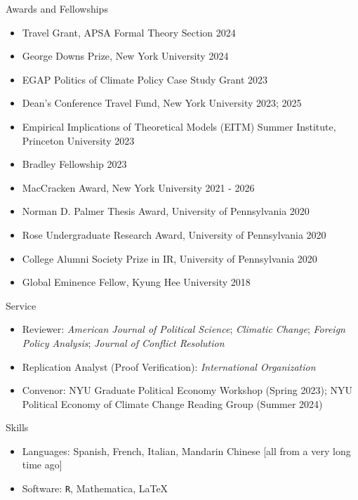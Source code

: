 \documentclass{resume} %
\begin{document}
\begin{rSection}{Awards and Fellowships}
\begin{itemize}
\item Travel Grant, APSA Formal Theory Section \hfill 2024
\item George Downs Prize, New York University \hfill 2024
\item EGAP Politics of Climate Policy Case Study Grant \hfill 2023
\item Dean's Conference Travel Fund, New York University \hfill 2023; 2025
\item Empirical Implications of Theoretical Models (EITM) Summer Institute, Princeton University \hfill 2023
\item Bradley Fellowship \hfill 2023
\item MacCracken Award, New York University \hfill 2021 - 2026
\item Norman D. Palmer Thesis Award, University of Pennsylvania \hfill 2020
\item Rose Undergraduate Research Award, University of Pennsylvania \hfill 2020
\item College Alumni Society Prize in IR, University of Pennsylvania \hfill 2020
\item Global Eminence Fellow, Kyung Hee University \hfill 2018
\end{itemize}
\end{rSection}

\begin{rSection}{Service}
\begin{itemize}
\item Reviewer:  \textit{American Journal of Political Science};  \textit{Climatic Change}; \textit{Foreign Policy Analysis}; \textit{Journal of Conflict Resolution}

\item Replication Analyst (Proof Verification):  \textit{International Organization} 
\item Convenor: NYU Graduate Political Economy Workshop (Spring 2023); NYU Political Economy of Climate Change Reading Group (Summer 2024)
\end{itemize}
 \end{rSection}

\begin{rSection}{Skills}
\begin{itemize}
\item Languages: Spanish, French, Italian, Mandarin Chinese [all from a very long time ago]
\item Software: \texttt{R}, Mathematica, \LaTeX
\end{itemize}
\end{rSection}
\end{document}
